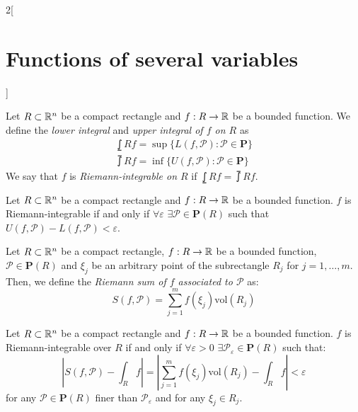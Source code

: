\documentclass[../../../main.tex]{subfiles}
\begin{document}
\begin{multicols}{2}[\section{Functions of several variables}]
\begin{definition}
  \end{definition}
  \begin{definition}
    Let $R\subset\mathbb{R}^n$ be a compact rectangle and $f:R\rightarrow\mathbb{R} $ be a bounded function. We define the \textit{lower integral} and \textit{upper integral of $f$ on $R$} as
    \begin{gather*}
      \lowint{R}{}f=\sup\{L(f,\mathcal{P}):\mathcal{P}\in\textbf{P}\}\\
      \upint{R}{}f=\inf\{U(f,\mathcal{P}):\mathcal{P}\in\textbf{P}\}
    \end{gather*} We say that $f$ is \textit{Riemann-integrable on $R$} if $\displaystyle\lowint{R}{}f=\upint{R}{}f$.
  \end{definition}
  \begin{prop}
    Let $R\subset\mathbb{R}^n$ be a compact rectangle and $f:R\rightarrow\mathbb{R} $ be a bounded function. $f$ is Riemann-integrable if and only if $\forall\varepsilon$ $\exists\mathcal{P}\in\textbf{P}(R)$ such that $U(f,\mathcal{P})-L(f,\mathcal{P})<\varepsilon$.
  \end{prop}
  \begin{definition}
    Let $R\subset\mathbb{R}^n$ be a compact rectangle, $f:R\rightarrow\mathbb{R} $ be a bounded function, $\mathcal{P}\in\textbf{P}(R)$ and $\xi_j$ be an arbitrary point of the subrectangle $R_j$ for $j=1,\ldots,m$. Then, we define the \textit{Riemann sum of $f$ associated to $\mathcal{P}$} as: $$S(f,\mathcal{P})=\sum_{j=1}^mf(\xi_j)\text{vol}(R_j)$$
  \end{definition}
  \begin{theorem}
    Let $R\subset\mathbb{R}^n$ be a compact rectangle and $f:R\rightarrow\mathbb{R} $ be a bounded function. $f$ is Riemann-integrable over $R$ if and only if $\forall\varepsilon>0$ $\exists\mathcal{P}_\varepsilon\in\textbf{P}(R)$ such that: $$\left|S(f,\mathcal{P})-\int_Rf\right|=\left|\sum_{j=1}^mf(\xi_j)\text{vol}(R_j)-\int_Rf\right|<\varepsilon$$ for any $\mathcal{P}\in\textbf{P}(R)$ finer than $\mathcal{P}_\varepsilon$ and for any $\xi_j\in R_j$.
  \end{theorem}

\end{multicols}
\end{document}
